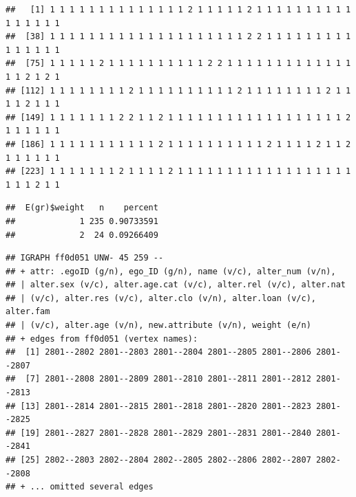 \documentclass[
]{book}
\newenvironment{Shaded}{\begin{snugshade}}{\end{snugshade}}
\newcommand{\CommentTok}[1]{\textcolor[rgb]{0.56,0.35,0.01}{\textit{#1}}}
\newcommand{\DecValTok}[1]{\textcolor[rgb]{0.00,0.00,0.81}{#1}}
\newcommand{\FunctionTok}[1]{\textcolor[rgb]{0.13,0.29,0.53}{\textbf{#1}}}
\newcommand{\NormalTok}[1]{#1}
\newcommand{\OtherTok}[1]{\textcolor[rgb]{0.56,0.35,0.01}{#1}}
\newcommand{\SpecialCharTok}[1]{\textcolor[rgb]{0.81,0.36,0.00}{\textbf{#1}}}
\begin{document}
\begin{Shaded}
\end{Shaded}

\begin{verbatim}
##   [1] 1 1 1 1 1 1 1 1 1 1 1 1 1 1 2 1 1 1 1 1 2 1 1 1 1 1 1 1 1 1 1 1 1 1 1 1 1
##  [38] 1 1 1 1 1 1 1 1 1 1 1 1 1 1 1 1 1 1 1 1 2 2 1 1 1 1 1 1 1 1 1 1 1 1 1 1 1
##  [75] 1 1 1 1 1 2 1 1 1 1 1 1 1 1 1 1 2 2 1 1 1 1 1 1 1 1 1 1 1 1 1 1 1 2 1 2 1
## [112] 1 1 1 1 1 1 1 1 2 1 1 1 1 1 1 1 1 1 1 2 1 1 1 1 1 1 1 1 2 1 1 1 1 2 1 1 1
## [149] 1 1 1 1 1 1 1 2 2 1 1 2 1 1 1 1 1 1 1 1 1 1 1 1 1 1 1 1 1 1 2 1 1 1 1 1 1
## [186] 1 1 1 1 1 1 1 1 1 1 1 2 1 1 1 1 1 1 1 1 1 1 2 1 1 1 1 2 1 1 2 1 1 1 1 1 1
## [223] 1 1 1 1 1 1 1 2 1 1 1 1 2 1 1 1 1 1 1 1 1 1 1 1 1 1 1 1 1 1 1 1 1 1 2 1 1
\end{verbatim}

\begin{Shaded}
\end{Shaded}

\begin{verbatim}
##  E(gr)$weight   n    percent
##             1 235 0.90733591
##             2  24 0.09266409
\end{verbatim}

\begin{Shaded}
\end{Shaded}

\begin{verbatim}
## IGRAPH ff0d051 UNW- 45 259 -- 
## + attr: .egoID (g/n), ego_ID (g/n), name (v/c), alter_num (v/n),
## | alter.sex (v/c), alter.age.cat (v/c), alter.rel (v/c), alter.nat
## | (v/c), alter.res (v/c), alter.clo (v/n), alter.loan (v/c), alter.fam
## | (v/c), alter.age (v/n), new.attribute (v/n), weight (e/n)
## + edges from ff0d051 (vertex names):
##  [1] 2801--2802 2801--2803 2801--2804 2801--2805 2801--2806 2801--2807
##  [7] 2801--2808 2801--2809 2801--2810 2801--2811 2801--2812 2801--2813
## [13] 2801--2814 2801--2815 2801--2818 2801--2820 2801--2823 2801--2825
## [19] 2801--2827 2801--2828 2801--2829 2801--2831 2801--2840 2801--2841
## [25] 2802--2803 2802--2804 2802--2805 2802--2806 2802--2807 2802--2808
## + ... omitted several edges
\end{verbatim}
\end{document}
